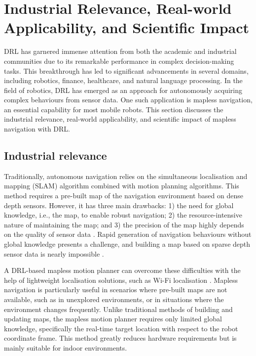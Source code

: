 \section{Industrial Relevance, Real-world Applicability, and Scientific Impact} \label{sec:impact}

DRL has garnered immense attention from both the academic and industrial communities due to its remarkable performance in complex decision-making tasks. This breakthrough has led to significant advancements in several domains, including robotics, finance, healthcare, and natural language processing. In the field of robotics, DRL has emerged as an approach for autonomously acquiring complex behaviours from sensor data. One such application is mapless navigation, an essential capability for most mobile robots. This section discusses the industrial relevance, real-world applicability, and scientific impact of mapless navigation with DRL.

\subsection{Industrial relevance}

Traditionally, autonomous navigation relies on the simultaneous localisation and mapping (SLAM) algorithm combined with motion planning algorithms. This method requires a pre-built map of the navigation environment based on dense depth sensors. However, it has three main drawbacks: 1) the need for global knowledge, i.e., the map, to enable robust navigation; 2) the resource-intensive nature of maintaining the map; and 3) the precision of the map highly depends on the quality of sensor data \cite{ref:virtual2real-drl}. Rapid generation of navigation behaviours without global knowledge presents a challenge, and building a map based on sparse depth sensor data is nearly impossible \cite{ref:virtual2real-drl}.

A DRL-based mapless motion planner can overcome these difficulties with the help of lightweight localisation solutions, such as Wi-Fi localisation \cite{ref:virtual2real-drl}. Mapless navigation is particularly useful in scenarios where pre-built maps are not available, such as in unexplored environments, or in situations where the environment changes frequently. Unlike traditional methods of building and updating maps, the mapless motion planner requires only limited global knowledge, specifically the real-time target location with respect to the robot coordinate frame. This method greatly reduces hardware requirements but is mainly suitable for indoor environments.

